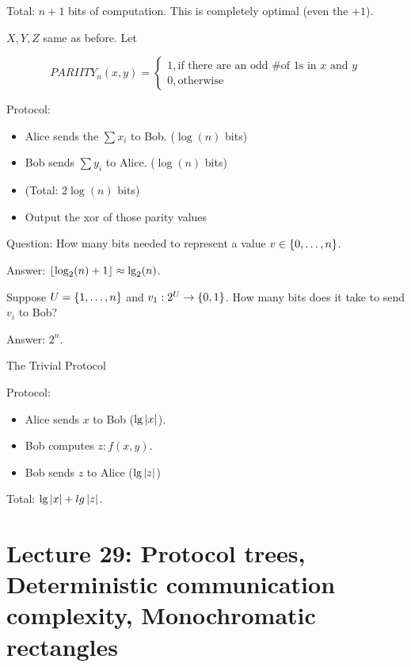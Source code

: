 Total: $n + 1$ bits of computation. This is completely optimal (even the $+1$).

\begin{example}
    $X, Y, Z$ same as before. Let

    \begin{dmath*}
        PARIITY_n(x, y) =
        \begin{cases}
            1, \text{if there are an odd \# of 1s in $x$ and $y$} \\
            0, \text{otherwise}
        \end{cases}
    \end{dmath*}
\end{example}

Protocol:

\begin{itemize}
    \item Alice sends the $\sum x_i$ to Bob. ($\log(n)$ bits)
    \item Bob sends $\sum y_i$ to Alice. ($\log(n)$ bits)
    \item (Total: $2\log(n)$ bits)
    \item Output the xor of those parity values
\end{itemize}

Question: How many bits needed to represent a value $v \in \left \{ 0, \ldots, n \right \}$.

Answer: $\left \lfloor \log_2(n) + 1 \right \rfloor \approx \lg_2(n)$.

\begin{example}
    Suppose $U = \left \{ 1, \ldots, n \right \}$ and $v_1: 2^U \rightarrow \left \{ 0, 1 \right \}$. How many bits does it take to send $v_i$ to Bob?

    Answer: $2^n$.
\end{example}

\begin{example}
    The Trivial Protocol

    Protocol:

    \begin{itemize}
        \item Alice sends $x$ to Bob ($\lg\left | x \right |$).
        \item Bob computes $z: f(x, y)$.
        \item Bob sends $z$ to Alice ($\lg\left | z \right |$)
    \end{itemize}

    Total: $\lg\left | x \right | + lg\left | z \right |$.
\end{example}

\section*{Lecture 29: Protocol trees, Deterministic communication complexity, Monochromatic rectangles}

